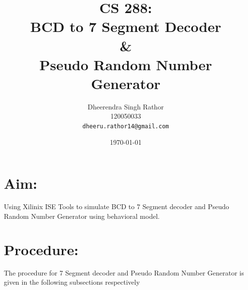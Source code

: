 \documentclass[12pt]{article}
\begin{document}
\title{\vspace{15ex}\Huge{CS 288:\\ BCD to 7 Segment Decoder \\ \& \\ Pseudo Random Number Generator}\vspace{15ex}}


\author{
  Dheerendra Singh Rathor\\120050033\\
  \texttt{dheeru.rathor14@gmail.com}\\[1 cm]
}

\date{\today}
\maketitle
\newpage

\section{Aim:}
Using Xilinix ISE Tools to simulate BCD to 7 Segment decoder and Pseudo Random Number Generator using behavioral model.

\section{Procedure:}
The procedure for 7 Segment decoder and Pseudo Random Number Generator is given in the following subsections respectively
\end{document}
